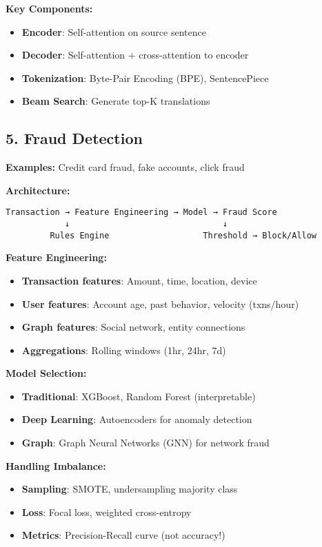 \documentclass[8pt,landscape]{article}
\begin{document}
\begin{multicols}{3}
\textbf{Key Components:}
\begin{itemize}
\item \textbf{Encoder}: Self-attention on source sentence
\item \textbf{Decoder}: Self-attention + cross-attention to encoder
\item \textbf{Tokenization}: Byte-Pair Encoding (BPE), SentencePiece
\item \textbf{Beam Search}: Generate top-K translations
\end{itemize}

\subsection*{5. Fraud Detection}
\textbf{Examples:} Credit card fraud, fake accounts, click fraud

\textbf{Architecture:}
\begin{verbatim}
Transaction → Feature Engineering → Model → Fraud Score
            ↓                               ↓
         Rules Engine                   Threshold → Block/Allow
\end{verbatim}

\textbf{Feature Engineering:}
\begin{itemize}
\item \textbf{Transaction features}: Amount, time, location, device
\item \textbf{User features}: Account age, past behavior, velocity (txns/hour)
\item \textbf{Graph features}: Social network, entity connections
\item \textbf{Aggregations}: Rolling windows (1hr, 24hr, 7d)
\end{itemize}

\textbf{Model Selection:}
\begin{itemize}
\item \textbf{Traditional}: XGBoost, Random Forest (interpretable)
\item \textbf{Deep Learning}: Autoencoders for anomaly detection
\item \textbf{Graph}: Graph Neural Networks (GNN) for network fraud
\end{itemize}

\textbf{Handling Imbalance:}
\begin{itemize}
\item \textbf{Sampling}: SMOTE, undersampling majority class
\item \textbf{Loss}: Focal loss, weighted cross-entropy
\item \textbf{Metrics}: Precision-Recall curve (not accuracy!)
\end{itemize}


\end{multicols}
\end{document}
